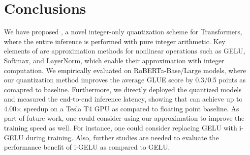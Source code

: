 \section{\textbf{Conclusions}}
\label{sec:conclusions}

We have proposed \OURS, a novel integer-only quantization scheme for Transformers, where the entire inference is performed with pure integer arithmetic.
Key elements of \OURS are approximation methods for nonlinear operations such as GELU, Softmax, and LayerNorm, which enable their approximation with integer computation.
We empirically evaluated \OURS on RoBERTa-Base/Large models, where our quantization method improves
the average GLUE score by 0.3/0.5 points as comapred to baseline.
Furthermore, we directly deployed the quantized models and measured the end-to-end inference latency, showing that \OURS can achieve up to 4.00$\times$ speedup on a Tesla T4 GPU as compared to floating point baseline.
As part of future work, one could consider
using our approximation to improve the training speed as well. For instance, one
could consider replacing GELU with i-GELU during training. Also,
further studies are needed to evaluate the performance benefit of i-GELU as compared to
GELU.